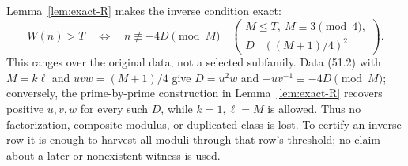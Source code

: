 \documentclass[10pt,reqno]{amsart}
\theoremstyle{definition}
\newcommand{\1}{\mathbf 1}
\begin{document}
Lemma~\ref{lem:exact-R} makes the inverse condition exact:
\begin{equation}\tag{58.3}
 W(n)>T\quad\Longleftrightarrow\quad
 n\not\equiv-4D\pmod M
 \quad\left(\begin{array}{l}M\leq T,\ M\equiv3\pmod4,\\
                         D\mid((M+1)/4)^2
       \end{array}\right).
\end{equation}
This ranges over the original data, not a selected subfamily.  Data (51.2)
with $M=k\ell$ and $uvw=(M+1)/4$ give $D=u^2w$ and
$-uv^{-1}\equiv-4D\pmod M$; conversely, the prime-by-prime construction in
Lemma~\ref{lem:exact-R} recovers positive $u,v,w$ for every such $D$, while
$k=1,\ell=M$ is allowed.  Thus no factorization, composite modulus, or
duplicated class is lost.  To certify an inverse row it is enough to harvest
all moduli through that row's threshold; no claim about a later or
nonexistent witness is used.
\end{document}
